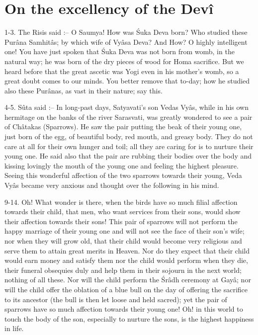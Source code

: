 \chapter{On the excellency of the Dev\^i}

1-3. The Risis said :-- O Saumya! How was \'Suka Deva born? Who studied these Pur\^ana Samhit\^as; by which wife of Vy\^asa Deva? And How? O highly intelligent one! You have just spoken that \'Suka Deva was not born from womb, in the natural way; he was born of the dry pieces of wood for Homa sacrifice. But we heard before that the great ascetic was Yogi even in his mother's womb, so a great doubt comes to our minds. You better remove that to-day; how he studied also these Pur\^anas, as vast in their nature; say this.

4-5. S\^uta said :-- In long-past days, Satyavati's son Vedas Vy\^as, while in his own hermitage on the banks of the river Sarasvati, was greatly wondered to see a pair of Ch\^atakas (Sparrows). He saw the pair putting  the beak of their young one, just born of the egg, of beautiful body, red mouth, and greasy body. They do not care at all for their own hunger and toil; all they are caring for is to nurture their young one. He said also that the pair are rubbing their bodies over the body and kissing lovingly the mouth of the young one and feeling the highest pleasure. Seeing this wonderful affection of the two sparrows towards their young, Veda Vy\^as became very anxious and thought over the following in his mind.

9-14. Oh! What wonder is there, when the birds have so much filial affection towards their child, that men, who want services from their sons, would show their affection towards their sons! This pair of sparrows will not perform the happy marriage of their young one and will not see the face of their son’s wife; nor when they will grow old, that their child would become very religious and serve them to attain great merits in Heaven. Nor do they expect that their child would earn money and satisfy them nor the child would perform when they die, their funeral obsequies duly and help them in their sojourn in the next world; nothing of all these. Nor will the child perform the \'Sr\^adh ceremony at Gay\^a; nor will the child offer the oblation of a blue bull on the day of offering the sacrifice to its ancestor (the bull is then let loose and held sacred); yet the pair of sparrows have so much affection towards their young one! Oh! in this world to touch the body of the son, especially to nurture the sons, is the highest happiness in life.

